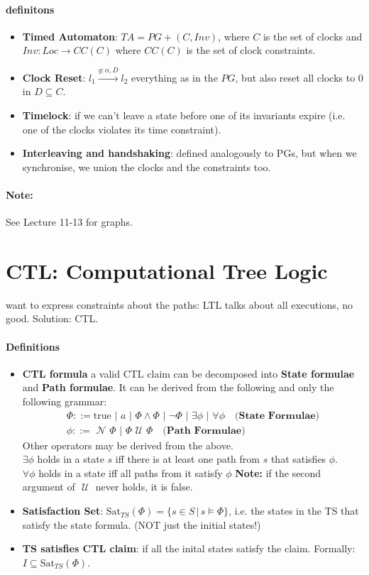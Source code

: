 \documentclass{article}
\newcommand{\U}{\,\,\mathcal{U}\,\,}
\newcommand{\N}{\,\,\mathcal{N}\,\,}
\begin{document}
\paragraph{definitons}
\begin{itemize}
\item \textbf{Timed Automaton}: $TA = PG + (C, Inv) $, where $C$ is the set of
  clocks and $Inv: Loc \rightarrow CC(C)$ where $CC(C)$ is the set of clock
  constraints.
\item \textbf{Clock Reset}: $l_1 \xrightarrow{g:\alpha, D} l_2$ everything as in
  the $PG$, but also reset all clocks to 0 in $D \subseteq C$.
\item \textbf{Timelock}: if we can't leave a state before one of its invariants
  expire (i.e. one of the clocks violates its time constraint).
\item \textbf{Interleaving and handshaking}: defined analogously to PGs, but
  when we synchronise, we union the clocks and the constraints too. 
\end{itemize}

\paragraph{Note:} See Lecture 11-13 for graphs.

\section{CTL: Computational Tree Logic}
want to express constraints about the paths: LTL talks about all executions, no
good.
Solution: CTL.
\paragraph{Definitions}
\begin{itemize}
\item \textbf{CTL formula} a valid CTL claim can be decomposed into
  \textbf{State formulae} and \textbf{Path formulae}. It can be derived from the
  following and only the following grammar:
  \begin{gather*}
    \Phi ::= \text{true} \,\,|\,\, a\,\,|\,\, \Phi \land \Phi \,\,|\,\, \neg
    \Phi\,\,|\,\, \exists \phi\,\,|\,\,\forall \phi\quad \textbf{(State Formulae)}\\
    \phi ::= \N \Phi\,\,|\,\, \Phi \U \Phi\quad \textbf{(Path Formulae)}
  \end{gather*}
  Other operators may be derived from the above.
  \\
  $\exists \phi$ holds in a state $s$ iff there is at least one path from $s$
  that satisfies $\phi$.
  \\
  $\forall \phi$ holds in a state iff all paths from it satisfy $\phi$
  \textbf{Note:} if the second argument of $\U$ never holds, it is false.
\item \textbf{Satisfaction Set}: $\text{Sat}_{TS}(\Phi) = \{s \in S\,|\,s\vDash
  \Phi\}$, i.e. the states in the TS that satisfy the state formula. (NOT just
  the initial states!)
\item \textbf{TS satisfies CTL claim}: if all the inital states satisfy the
  claim. Formally: $I \subseteq \text{Sat}_{TS}(\Phi)$.
\end{itemize}
\end{document}
